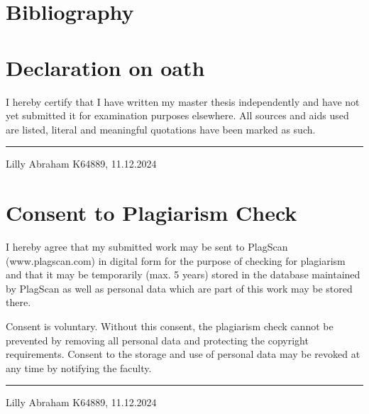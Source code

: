 \documentclass{report} %
\begin{document}
\newpage 

\newpage 

\chapter*{Bibliography}
\newpage 

\newpage 

\chapter*{Declaration on oath}

\vspace{1cm}

\noindent I hereby certify that I have written my master thesis independently and have not yet submitted it for examination purposes elsewhere. All sources and aids used are listed, literal and meaningful quotations have been marked as such.

\vspace{3cm}
\hfill\rule{15cm}{0.4pt} %

\begin{center}
    Lilly Abraham K64889, 11.12.2024 %
\end{center}

\newpage 

\chapter*{Consent to Plagiarism Check}
\vspace{1cm}

\noindent I hereby agree that my submitted work may be sent to PlagScan (www.plagscan.com) in digital form for the purpose of checking for plagiarism and that it may be temporarily (max. 5 years) stored in the database maintained by PlagScan as well as personal data which are part of this work may be stored there.

\vspace{0.5cm}

\noindent Consent is voluntary. Without this consent, the plagiarism check cannot be prevented by removing all personal data and protecting the copyright requirements. Consent to the storage and use of personal data may be revoked at any time by notifying the faculty.


\vspace{3cm}
\hfill\rule{15cm}{0.4pt} %

\begin{center}
    Lilly Abraham K64889, 11.12.2024 %
\end{center}
\end{document}
